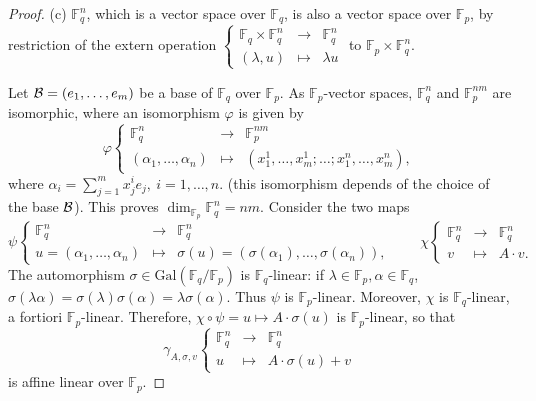 \documentclass[11pt,a4paper]{article}
\newcommand{\F}{\mathbb{F}}
\newcommand{\Gal}{\mathrm{Gal}}
\begin{document}
\begin{proof}
\item[(c)]  $\F_q^n$, which is a vector space over $\F_q$, is also a vector space over $\F_p$, by restriction of the extern operation 
$
\left\{
\begin{array}{ccc}
\F_q \times \F_q^n & \to & \F_q^n\\
(\lambda,u) & \mapsto &\lambda u
\end{array}
\right.
$
to $\F_p \times \F_q^n$.

Let ${\cal B} = (e_1,\ldots,e_m)$ be a base of $\F_q$ over $\F_p$.
As $\F_p$-vector spaces, $\F_q^n$ and $\F_p^{nm}$ are isomorphic, where an isomorphism $\varphi$ is given by
$$
\varphi \left\{
\begin{array}{ccc}
\F_q^n & \to & \F_p^{nm}\\
(\alpha_1,\ldots,\alpha_n)& \mapsto &(x_1^1,\ldots,x_m^1;\ldots;x_1^n,\ldots,x_m^n),
\end{array}
\right.
$$
where $\alpha_i = \sum_{j=1}^m x_j^i e_j,\ i=1,\ldots,n.$ (this isomorphism depends of the choice of the base $\cal B$). This proves $\dim_{\F_p} \F_q^n = nm$.
Consider the two maps
$$
\psi
\left\{
\begin{array}{ccc}
\F_q^n &\to &\F_q^n\\
u  = (\alpha_1,\ldots,\alpha_n)& \mapsto &\sigma(u) = (\sigma(\alpha_1),\ldots,\sigma(\alpha_n)),
\end{array}
\right.
\qquad 
\chi
\left\{
\begin{array}{ccc}
\F_q^n &\to &\F_q^n\\
v& \mapsto &A \cdot v.
\end{array}
\right.
$$
The automorphism $\sigma \in \Gal(\F_q/\F_p)$ is $\F_q$-linear: if $\lambda \in \F_p, \alpha \in \F_q$, $\sigma(\lambda \alpha) = \sigma(\lambda) \sigma(\alpha) = \lambda \sigma(\alpha)$. Thus $\psi$ is $\F_p$-linear. Moreover, $\chi$ is $\F_q$-linear, a fortiori $\F_p$-linear. Therefore, $\chi \circ \psi = u \mapsto A\cdot \sigma(u)$ is $\F_p$-linear, so that
$$
\gamma_{A,\sigma,v}
\left\{
\begin{array}{ccc}
\F_q^n & \to & \F_q^n\\
u &\mapsto & A\cdot \sigma(u) + v
\end{array}
\right.
$$
is affine linear over $\F_p$.
 \end{proof}
 
 
\end{document}
